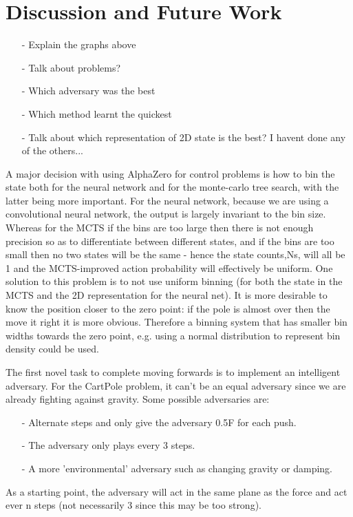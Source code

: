 \documentclass[12pt]{article}
\begin{document}
\section{Discussion and Future Work}
\begin{itemize}
   \item[-] Explain the graphs above
   \item[-] Talk about problems?
   \item[-] Which adversary was the best
   \item[-] Which method learnt the quickest
   \item[-] Talk about which representation of 2D state is the best? I havent done any of the others...
\end{itemize}

A major decision with using AlphaZero for control problems is how to bin the state both for the neural network and for the monte-carlo tree search, with the latter being more important. For the neural network, because we are using a convolutional neural network, the output is largely invariant to the bin size. Whereas for the MCTS if the bins are too large then there is not enough precision so as to differentiate between different states, and if the bins are too small then no two states will be the same - hence the state counts,Ns, will all be 1 and the MCTS-improved action probability will effectively be uniform. One solution to this problem is to not use uniform binning (for both the state in the MCTS and the 2D representation for the neural net). It is more desirable to know the position closer to the zero point: if the pole is almost over then the move it right it is more obvious. Therefore a binning system that has smaller bin widths towards the zero point, e.g. using a normal distribution to represent bin density could be used.

The first novel task to complete moving forwards is to implement an intelligent adversary. For the CartPole problem, it can’t be an equal adversary since we are already fighting against gravity. Some possible adversaries are: 
\begin{itemize}
   \item[-] Alternate steps and only give the adversary 0.5F for each push.
   \item[-] The adversary only plays every 3 steps.
   \item[-] A more 'environmental' adversary such as changing gravity or damping.
\end{itemize}
 As a starting point, the adversary will act in the same plane as the force and act ever n steps (not necessarily 3 since this may be too strong). 
\end{document}
